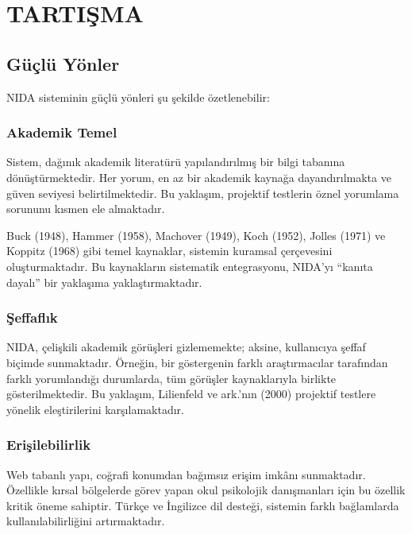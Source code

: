
\chapter{TARTIŞMA}

\section{Güçlü Yönler}

NIDA sisteminin güçlü yönleri şu şekilde özetlenebilir:

\subsection{Akademik Temel}

Sistem, dağınık akademik literatürü yapılandırılmış bir bilgi tabanına dönüştürmektedir. Her yorum, en az bir akademik kaynağa dayandırılmakta ve güven seviyesi belirtilmektedir. Bu yaklaşım, projektif testlerin öznel yorumlama sorununu kısmen ele almaktadır.

Buck (1948), Hammer (1958), Machover (1949), Koch (1952), Jolles (1971) ve Koppitz (1968) gibi temel kaynaklar, sistemin kuramsal çerçevesini oluşturmaktadır. Bu kaynakların sistematik entegrasyonu, NIDA'yı ``kanıta dayalı'' bir yaklaşıma yaklaştırmaktadır.

\subsection{Şeffaflık}

NIDA, çelişkili akademik görüşleri gizlememekte; aksine, kullanıcıya şeffaf biçimde sunmaktadır. Örneğin, bir göstergenin farklı araştırmacılar tarafından farklı yorumlandığı durumlarda, tüm görüşler kaynaklarıyla birlikte gösterilmektedir. Bu yaklaşım, Lilienfeld ve ark.'nın (2000) projektif testlere yönelik eleştirilerini karşılamaktadır.

\subsection{Erişilebilirlik}

Web tabanlı yapı, coğrafi konumdan bağımsız erişim imkânı sunmaktadır. Özellikle kırsal bölgelerde görev yapan okul psikolojik danışmanları için bu özellik kritik öneme sahiptir. Türkçe ve İngilizce dil desteği, sistemin farklı bağlamlarda kullanılabilirliğini artırmaktadır.

